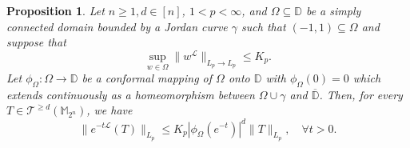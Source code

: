 \documentclass{amsbook}
\newtheorem{proposition}[theorem]{Proposition}
\theoremstyle{definition}
\theoremstyle{remark}
\numberwithin{section}{chapter}
\numberwithin{equation}{chapter}
\newcommand{\1}{\mathbf{1}}
\begin{document}
\begin{proposition}\label{cpro}
Let $n\geq1, d \in [n]$, $1<p<\infty$,  and $\Omega \subseteq \mathbb{D}$ be a simply connected domain bounded by a Jordan curve $\gamma$ such that $(-1,1) \subseteq \Omega$ and suppose that
\begin{equation}\label{cpro-k-i}
\sup _{w \in \Omega} \|w^{\mathcal{L}}\|_{L_{p}\rightarrow L_{p}} \leq K_p.
\end{equation}
Let $\phi_{\Omega}: \Omega \rightarrow \mathbb{D}$ be a conformal mapping of $\Omega$ onto $\mathbb{D}$ with $\phi_{\Omega}(0)=0$ which extends continuously as a homeomorphism between $\Omega \cup \gamma$ and $\overline{\mathbb{D}}$. Then, for  every $T\in \mathcal{T}^{\geq d}(\mathbb{M}_{2^n})$, we have
\[
\|e^{-t \mathcal{L}} (T)\|_{L_{p}} \leq K_p|\phi_{\Omega}(e^{-t})|^{d}\|T\|_{L_{p}},\quad \forall t>0.
\]
\end{proposition}
\end{document}
